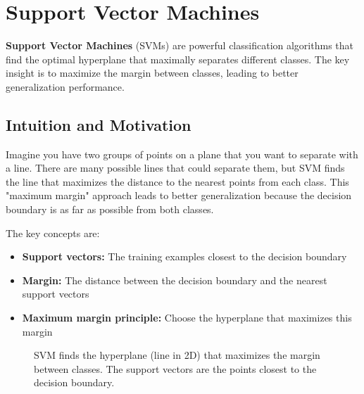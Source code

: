 
\section{Support Vector Machines }
\label{sec:svm}

\textbf{Support Vector Machines} (SVMs) are powerful classification algorithms that find the optimal hyperplane that maximally separates different classes. The key insight is to maximize the margin between classes, leading to better generalization performance.

\subsection{Intuition and Motivation}

Imagine you have two groups of points on a plane that you want to separate with a line. There are many possible lines that could separate them, but SVM finds the line that maximizes the distance to the nearest points from each class. This "maximum margin" approach leads to better generalization because the decision boundary is as far as possible from both classes.

The key concepts are:
\begin{itemize}
    \item \textbf{Support vectors:} The training examples closest to the decision boundary
    \item \textbf{Margin:} The distance between the decision boundary and the nearest support vectors
    \item \textbf{Maximum margin principle:} Choose the hyperplane that maximizes this margin
\end{itemize}

\begin{figure}[htbp]
\centering
{}
\caption{SVM finds the hyperplane (line in 2D) that maximizes the margin between classes. The support vectors are the points closest to the decision boundary.}
\label{fig:svm-margin}
\end{figure}

